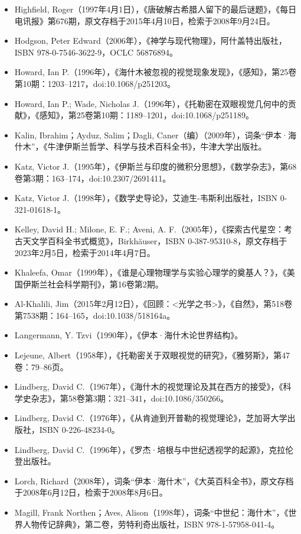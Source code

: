 \begin{itemize}
\item Highfield, Roger（1997年4月1日），《唐破解古希腊人留下的最后谜题》，《每日电讯报》第676期，原文存档于2015年4月10日，检索于2008年9月24日。
\item Hodgson, Peter Edward（2006年），《神学与现代物理》，阿什盖特出版社，ISBN 978-0-7546-3622-9，OCLC 56876894。
\item Howard, Ian P.（1996年），《海什木被忽视的视觉现象发现》，《感知》，第25卷第10期：1203–1217，doi:10.1068/p251203。
\item Howard, Ian P.; Wade, Nicholas J.（1996年），《托勒密在双眼视觉几何中的贡献》，《感知》，第25卷第10期：1189–1201，doi:10.1068/p251189。
\item Kalin, Ibrahim；Ayduz, Salim；Dagli, Caner（编）（2009年），词条“伊本·海什木”，《牛津伊斯兰哲学、科学与技术百科全书》，牛津大学出版社。
\item Katz, Victor J.（1995年），《伊斯兰与印度的微积分思想》，《数学杂志》，第68卷第3期：163–174，doi:10.2307/2691411。
\item Katz, Victor J.（1998年），《数学史导论》，艾迪生-韦斯利出版社，ISBN 0-321-01618-1。
\item Kelley, David H.; Milone, E. F.; Aveni, A. F.（2005年），《探索古代星空：考古天文学百科全书式概览》，Birkhäuser，ISBN 0-387-95310-8，原文存档于2023年2月5日，检索于2014年4月7日。
\item Khaleefa, Omar（1999年），《谁是心理物理学与实验心理学的奠基人？》，《美国伊斯兰社会科学期刊》，第16卷第2期。
\item Al-Khalili, Jim（2015年2月12日），《回顾：<光学之书>》，《自然》，第518卷第7538期：164–165，doi:10.1038/518164a。
\item Langermann, Y. Tzvi（1990年），《伊本·海什木论世界结构》。
\item Lejeune, Albert（1958年），《托勒密关于双眼视觉的研究》，《雅努斯》，第47卷：79–86页。
\item Lindberg, David C.（1967年），《海什木的视觉理论及其在西方的接受》，《科学史杂志》，第58卷第3期：321–341，doi:10.1086/350266。
\item Lindberg, David C.（1976年），《从肯迪到开普勒的视觉理论》，芝加哥大学出版社，ISBN 0-226-48234-0。
\item Lindberg, David C.（1996年），《罗杰·培根与中世纪透视学的起源》，克拉伦登出版社。
\item Lorch, Richard（2008年），词条“伊本·海什木”，《大英百科全书》，原文存档于2008年6月12日，检索于2008年8月6日。
\item Magill, Frank Northen；Aves, Alison（1998年），词条“中世纪：海什木”，《世界人物传记辞典》，第二卷，劳特利奇出版社，ISBN 978-1-57958-041-4。

\end{itemize}
